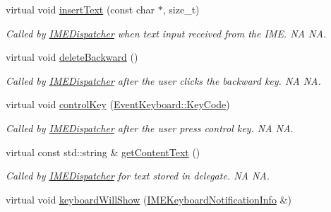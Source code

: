 \begin{DoxyCompactItemize}
\mbox{\label{classIMEDelegate_a27507ddf30ab25d8995d69865050e4af}} 
virtual void \hyperlink{classIMEDelegate_a27507ddf30ab25d8995d69865050e4af}{insert\+Text} (const char $\ast$, size\+\_\+t)
\begin{DoxyCompactList}\small\item\em Called by \hyperlink{classIMEDispatcher}{I\+M\+E\+Dispatcher} when text input received from the I\+ME.  NA  NA. \end{DoxyCompactList}\item 
\mbox{\label{classIMEDelegate_ac7df750a229e87f95fde61edeb199813}} 
virtual void \hyperlink{classIMEDelegate_ac7df750a229e87f95fde61edeb199813}{delete\+Backward} ()
\begin{DoxyCompactList}\small\item\em Called by \hyperlink{classIMEDispatcher}{I\+M\+E\+Dispatcher} after the user clicks the backward key.  NA  NA. \end{DoxyCompactList}\item 
\mbox{\label{classIMEDelegate_a74d5cae3d73bc721440cd717025e7896}} 
virtual void \hyperlink{classIMEDelegate_a74d5cae3d73bc721440cd717025e7896}{control\+Key} (\hyperlink{classEventKeyboard_a7cd3fa46515673276ce8ec7f0e051606}{Event\+Keyboard\+::\+Key\+Code})
\begin{DoxyCompactList}\small\item\em Called by \hyperlink{classIMEDispatcher}{I\+M\+E\+Dispatcher} after the user press control key.  NA  NA. \end{DoxyCompactList}\item 
\mbox{\label{classIMEDelegate_afc97a1b9d50cfcfa7cda4a3cf14dfb9c}} 
virtual const std\+::string \& \hyperlink{classIMEDelegate_afc97a1b9d50cfcfa7cda4a3cf14dfb9c}{get\+Content\+Text} ()
\begin{DoxyCompactList}\small\item\em Called by \hyperlink{classIMEDispatcher}{I\+M\+E\+Dispatcher} for text stored in delegate.  NA  NA. \end{DoxyCompactList}\item 
virtual void \hyperlink{classIMEDelegate_a5e4b845087aa0946d99c39082df1d4d5}{keyboard\+Will\+Show} (\hyperlink{structIMEKeyboardNotificationInfo}{I\+M\+E\+Keyboard\+Notification\+Info} \&)
\item 

\end{DoxyCompactItemize}

